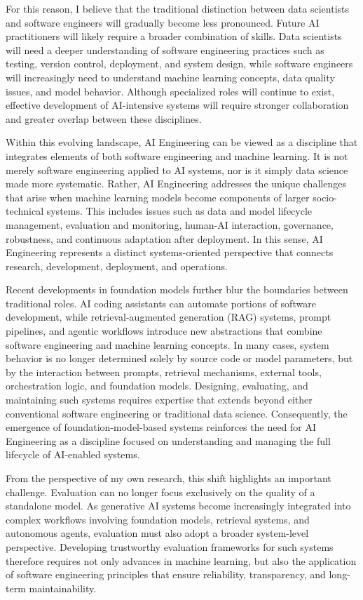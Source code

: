 \documentclass{article}
\begin{document}
For this reason, I believe that the traditional distinction between data scientists and software engineers will gradually become less pronounced. Future AI practitioners will likely require a broader combination of skills. Data scientists will need a deeper understanding of software engineering practices such as testing, version control, deployment, and system design, while software engineers will increasingly need to understand machine learning concepts, data quality issues, and model behavior. Although specialized roles will continue to exist, effective development of AI-intensive systems will require stronger collaboration and greater overlap between these disciplines.

Within this evolving landscape, AI Engineering can be viewed as a discipline that integrates elements of both software engineering and machine learning. It is not merely software engineering applied to AI systems, nor is it simply data science made more systematic. Rather, AI Engineering addresses the unique challenges that arise when machine learning models become components of larger socio-technical systems. This includes issues such as data and model lifecycle management, evaluation and monitoring, human-AI interaction, governance, robustness, and continuous adaptation after deployment. In this sense, AI Engineering represents a distinct systems-oriented perspective that connects research, development, deployment, and operations.

Recent developments in foundation models further blur the boundaries between traditional roles. AI coding assistants can automate portions of software development, while retrieval-augmented generation (RAG) systems, prompt pipelines, and agentic workflows introduce new abstractions that combine software engineering and machine learning concepts. In many cases, system behavior is no longer determined solely by source code or model parameters, but by the interaction between prompts, retrieval mechanisms, external tools, orchestration logic, and foundation models. Designing, evaluating, and maintaining such systems requires expertise that extends beyond either conventional software engineering or traditional data science. Consequently, the emergence of foundation-model-based systems reinforces the need for AI Engineering as a discipline focused on understanding and managing the full lifecycle of AI-enabled systems.

From the perspective of my own research, this shift highlights an important challenge. Evaluation can no longer focus exclusively on the quality of a standalone model. As generative AI systems become increasingly integrated into complex workflows involving foundation models, retrieval systems, and autonomous agents, evaluation must also adopt a broader system-level perspective. Developing trustworthy evaluation frameworks for such systems therefore requires not only advances in machine learning, but also the application of software engineering principles that ensure reliability, transparency, and long-term maintainability.
\end{document}
